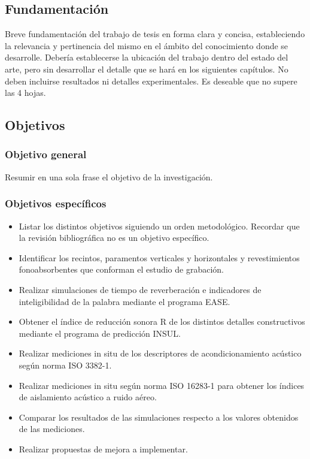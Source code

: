 \subsection{Fundamentación}

Breve fundamentación del trabajo de tesis en forma clara y concisa, estableciendo la relevancia y pertinencia del mismo en el ámbito del conocimiento donde se desarrolle. Debería establecerse la ubicación del trabajo dentro del estado del arte, pero sin desarrollar el detalle que se hará en los siguientes capítulos. No deben incluirse resultados ni detalles experimentales. Es deseable que no supere las 4 hojas.


\subsection{Objetivos}

\subsubsection{Objetivo general}

Resumir en una sola frase el objetivo de la investigación.

\subsubsection{Objetivos específicos}

\begin{itemize}
    \item Listar los distintos objetivos siguiendo un orden metodológico. Recordar que la revisión bibliográfica no es un objetivo específico.
    \item Identificar los recintos, paramentos verticales y horizontales y revestimientos fonoabsorbentes que conforman el estudio de grabación.
    \item Realizar simulaciones de tiempo de reverberación e indicadores de inteligibilidad de la palabra mediante el programa EASE.
    \item Obtener el índice de reducción sonora R de los distintos detalles constructivos mediante el programa de predicción INSUL.
    \item Realizar mediciones in situ de los descriptores de acondicionamiento acústico según norma ISO 3382-1.
    \item Realizar mediciones in situ según norma ISO 16283-1 para obtener los índices de aislamiento acústico a ruido aéreo.
    \item Comparar los resultados de las simulaciones respecto a los valores obtenidos de las mediciones.
    \item Realizar propuestas de mejora a implementar.
\end{itemize}


